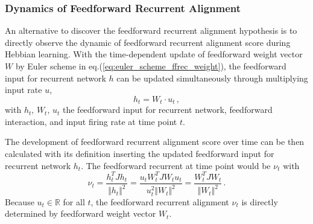\documentclass[11pt]{article}
\begin{document}
{	\subsubsection{Dynamics of Feedforward Recurrent Alignment}
	
	An alternative to discover the feedforward recurrent alignment hypothesis is to directly observe the dynamic of feedforward recurrent alignment score during Hebbian learning. With the time-dependent update of feedforward weight vector $W$ by Euler scheme in  eq.(\ref{eq:euler_scheme_ffrec_weight}), the feedforward input for recurrent network $h$ can be updated simultaneously through multiplying input rate $u$, 
		\begin{equation} \label{eq:feedforward_input}
			h_t = W_t \cdot u_t \, ,
		\end{equation}
	with $h_t,\, W_t, \, u_t$ the feedforward input for recurrent network, feedforward interaction, and input firing rate at time point $t$. 
	
	The development of feedforward recurrent alignment score over time can be then calculated with its definition inserting the updated feedforward input for recurrent network $h_t$. The feedforward recurrent at time point would be $\nu_t$ with
		\begin{equation} \label{eq:ffrec_update}
			\nu_t = \frac{h_t^T J h_t}{\Vert h_t \Vert ^2} = \frac{u_t W_t^T J W_t u_t}{u_t^2 \Vert W_t \Vert ^2} = \frac{W_t^T J W_t}{\Vert W_t \Vert^2}\, . 
		\end{equation}
	Because $u_t \in \mathbb{R}$ for all $t$, the feedforward recurrent alignment $\nu_t$ is directly determined by feedforward weight vector $W_t$.  
	
}
\end{document}
